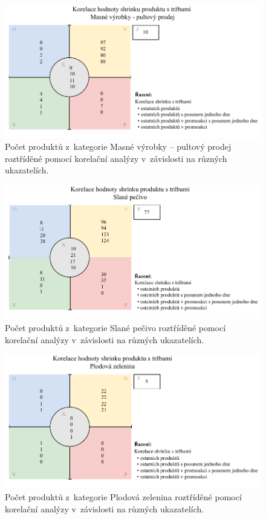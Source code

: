 \begin{figure}[h!]
    \centering
    \captionsetup{justification=centering}
    \includegraphics[width=\textwidth]{obrazky/kor_maso.pdf}
    \caption{Počet produktů z~kategorie Masné výrobky -- pultový prodej roztříděné pomocí korelační analýzy v~závislosti na různých ukazatelích.}
    \label{obr:kategCorrPorovnani}
\end{figure}

\begin{figure}[h!]
    \centering
    \captionsetup{justification=centering}
    \includegraphics[width=\textwidth]{obrazky/kor_pec.pdf}
    \caption{Počet produktů z~kategorie Slané pečivo roztříděné pomocí korelační analýzy v~závislosti na různých ukazatelích.}
    \label{obr:kategCorrPorovnaniPec}
\end{figure}

\begin{figure}[h!]
    \centering
    \captionsetup{justification=centering}
    \includegraphics[width=\textwidth]{obrazky/kor_zel.pdf}
    \caption{Počet produktů z~kategorie Plodová zelenina roztříděné pomocí korelační analýzy v~závislosti na různých ukazatelích.}
    \label{obr:kategCorrPorovnaniZel}
\end{figure}

